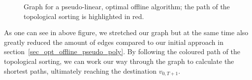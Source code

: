\documentclass[hidelinks]{article}
\theoremstyle{plain}
\theoremstyle{definition}
\theoremstyle{rem}
\begin{document}
\begin{figure}[H]
{
}
\caption{Graph for a pseudo-linear, optimal offline algorithm; the path of the topological sorting is highlighted in red.}
\label{fig_graph_pseudo_lin}
\end{figure}
As one can see in above figure, we stretched our graph but at the same time also greatly reduced the amount of edges compared to our initial approach in section~\ref{sec_opt_offline_pseudo_poly}. By following the coloured path of the topological sorting, we can work our way through the graph to calculate the shortest paths, ultimately reaching the destination $v_{0,T+1}$. 
\end{document}
